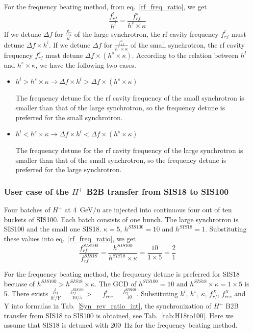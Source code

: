 For the frequency beating method, from eq.~\ref{rf_freq_ratio}, we get
\begin{equation}
\frac{f_{rf}^{l}}{h^l}= \frac{f_{rf}^{s}}{h^s \times \kappa} 
\end{equation}
If we detune $\Delta f$ for $\frac{f_{rf}^{l}}{h^l}$ of the large synchrotron, the rf cavity frequency $ f_{rf}^{l}$ must detune $\Delta f \times h^l$. If we detune $\Delta f$ for $\frac{f_{rf}^{s}}{h^s \times \kappa}$ of the small synchrotron, the rf cavity frequency $ f_{rf}^{s}$ must detune $\Delta f \times (h^s \times \kappa)$. According to the relation between $h^l$ and $h^s \times \kappa$, we have the following two cases.
\begin{itemize}
	\item $h^l > h^s \times \kappa \rightarrow \Delta f \times h^l > \Delta f \times (h^s \times \kappa)$ 

The frequency detune for the rf cavity frequency of the small synchrotron is smaller than that of the large synchrotron, so the frequency detune is preferred for the small synchrotron.
	\item $h^l < h^s \times \kappa \rightarrow \Delta f \times h^l < \Delta f \times (h^s \times \kappa)$

The frequency detune for the rf cavity frequency of the large synchrotron is smaller than that of the small synchrotron, so the frequency detune is preferred for the large synchrotron.
\end{itemize}
\subsubsection{User case of the $H^{+}$ B2B transfer from SIS18 to SIS100}
Four batches of $H^{+}$ at \SI{4}{GeV/\atomicmassunit} are injected into continuous four out of ten buckets of SIS100. Each batch consists of one bunch. The large synchrotron is SIS100 and the small one SIS18. $\kappa=5$, $h^{SIS100}=10$ and $h^{SIS18}=1$. Substituting these values into eq.~\ref{rf_freq_ratio}, we get
\begin{equation}
\frac{f_{rf}^{SIS100}}{f_{rf}^{SIS18}}= \frac {h^{SIS100}}{h^{SIS18} \times \kappa}= \frac{10}{1 \times 5}=\frac{2}{1}
\end{equation}

For the frequency beating method, the frequency detune is preferred for SIS18 becuase of $h^{SIS100} > h^{SIS18} \times \kappa$. The GCD of $h^{SIS100}=10$ and $h^{SIS18} \times \kappa=1\times 5$  is 5.
There exists $\frac{f_{rf}^{l}}{h^l/Y}=\frac{f_{rf}^{SIS100}}{10/5}>=f_{rev}^{l}=\frac{f_{rf}^{SIS100}}{10}$. Substituting $h^l$, $h^s$, $\kappa$, $f_{rf}^{X}$, $f_{rev}^{X}$ and Y into formulas in Tab.~\ref{Syn_rev_ratio_int}, the synchronization of $H^{+}$ B2B transfer from SIS18 to SIS100 is obtained, see Tab.~\ref{tab:H18to100}. Here we assume that SIS18 is detuned with \SI{200}{Hz} for the frequency beating method. 

